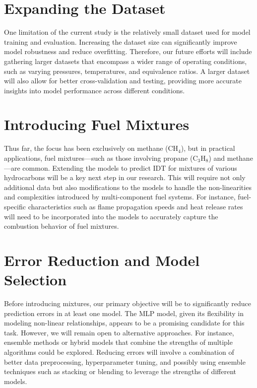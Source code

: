 \documentclass[12pt]{report}
\begin{document}
\section{Expanding the Dataset}

One limitation of the current study is the relatively small dataset used for model training and evaluation. Increasing the dataset size can significantly improve model robustness and reduce overfitting. Therefore, our future efforts will include gathering larger datasets that encompass a wider range of operating conditions, such as varying pressures, temperatures, and equivalence ratios. A larger dataset will also allow for better cross-validation and testing, providing more accurate insights into model performance across different conditions.

\section{Introducing Fuel Mixtures}

Thus far, the focus has been exclusively on methane (CH\(_4\)), but in practical applications, fuel mixtures—such as those involving propane (C\(_3\)H\(_8\)) and methane—are common. Extending the models to predict IDT for mixtures of various hydrocarbons will be a key next step in our research. This will require not only additional data but also modifications to the models to handle the non-linearities and complexities introduced by multi-component fuel systems. For instance, fuel-specific characteristics such as flame propagation speeds and heat release rates will need to be incorporated into the models to accurately capture the combustion behavior of fuel mixtures.

\section{Error Reduction and Model Selection}

Before introducing mixtures, our primary objective will be to significantly reduce prediction errors in at least one model. The MLP model, given its flexibility in modeling non-linear relationships, appears to be a promising candidate for this task. However, we will remain open to alternative approaches. For instance, ensemble methods or hybrid models that combine the strengths of multiple algorithms could be explored. Reducing errors will involve a combination of better data preprocessing, hyperparameter tuning, and possibly using ensemble techniques such as stacking or blending to leverage the strengths of different models.
\end{document}
